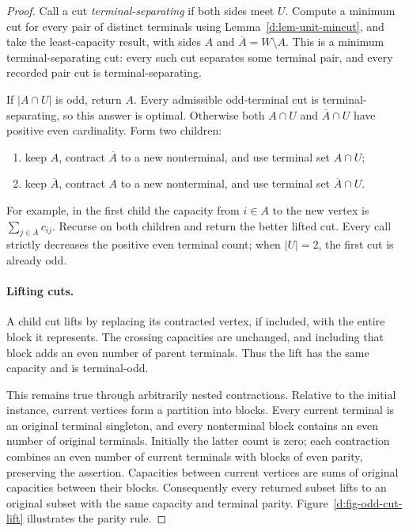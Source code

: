 \begin{proof}
Call a cut \emph{terminal-separating} if both sides meet \(U\).
Compute a minimum cut for every pair of distinct terminals using
Lemma~\ref{d:lem-unit-mincut}, and take the least-capacity result,
with sides \(A\) and \(\overline A=W\setminus A\).
This is a minimum terminal-separating cut: every such cut separates
some terminal pair, and every recorded pair cut is terminal-separating.

If \(|A\cap U|\) is odd, return \(A\).  Every admissible odd-terminal
cut is terminal-separating, so this answer is optimal.
Otherwise both \(A\cap U\) and \(\overline A\cap U\) have positive even
cardinality.  Form two children:
\begin{enumerate}[label=(\roman*),nosep]
\item keep \(A\), contract \(\overline A\) to a new nonterminal, and
      use terminal set \(A\cap U\);
\item keep \(\overline A\), contract \(A\) to a new nonterminal, and
      use terminal set \(\overline A\cap U\).
\end{enumerate}
For example, in the first child the capacity from \(i\in A\) to the
new vertex is \(\sum_{j\in\overline A}c_{ij}\).
Recurse on both children and return the better lifted cut.
Every call strictly decreases the positive even terminal count;
when \(|U|=2\), the first cut is already odd.

\paragraph{Lifting cuts.}
A child cut lifts by replacing its contracted vertex, if included,
with the entire block it represents.  The crossing capacities are
unchanged, and including that block adds an even number of parent
terminals.  Thus the lift has the same capacity and is terminal-odd.

This remains true through arbitrarily nested contractions.
Relative to the initial instance, current vertices form a partition
into blocks.  Every current terminal is an original terminal singleton,
and every nonterminal block contains an even number of original terminals.
Initially the latter count is zero; each contraction combines an even
number of current terminals with blocks of even parity, preserving
the assertion.  Capacities between current vertices are sums of
original capacities between their blocks.
Consequently every returned subset lifts to an original subset with
the same capacity and terminal parity.
Figure~\ref{d:fig-odd-cut-lift} illustrates the parity rule.


\end{proof}
